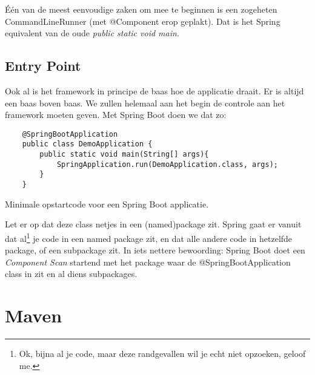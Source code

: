 Één van de meest eenvoudige zaken om mee te beginnen is een zogeheten CommandLineRunner (met @Component erop geplakt). 
Dat is het Spring equivalent van de oude \emph{public static void main}.

\subsection{Entry Point}

Ook al is het framework in principe de baas hoe de applicatie draait. Er is altijd een baas boven baas. 
We zullen helemaal aan het begin de controle aan het framework moeten geven. Met Spring Boot doen we dat zo:

\begin{listing}[H]
    \begin{verbatim}
    @SpringBootApplication
    public class DemoApplication {
        public static void main(String[] args){
            SpringApplication.run(DemoApplication.class, args);
        }
    }
    \end{verbatim}
    \caption{Minimale opstartcode voor een Spring Boot applicatie.}
    \label{code:springstart}
\end{listing}

Let er op dat deze class netjes in een (named)package zit. Spring gaat er vanuit dat 
al\footnote[]{Ok, bijna al je code, maar deze randgevallen wil je echt niet opzoeken, geloof me.} 
je code in een named package zit, en dat alle andere code in hetzelfde package, of een subpackage zit.
In iets nettere bewoording: Spring Boot doet een \emph{Component Scan} startend met het package waar 
de @SpringBootApplication class in zit en al diens subpackages.

\section{Maven}